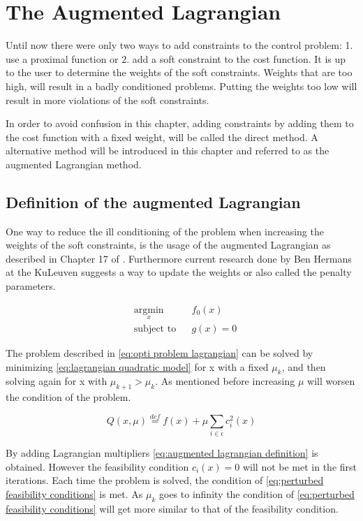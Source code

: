 \chapter{The Augmented Lagrangian}
Until now there were only two ways to add constraints to the control problem: 1. use a proximal function or 2. add a soft constraint to the cost function. It is up to the user to determine the weights of the soft constraints. Weights that are too high, will result in a badly conditioned problems. Putting the weights too low will result in more violations of the soft constraints.

In order to avoid confusion in this chapter, adding constraints by adding them to the cost function with a fixed weight, will be called the direct method. A alternative method will be introduced in this chapter and referred to as the augmented Lagrangian method.

\section{Definition of the augmented Lagrangian}
	One way to reduce the ill conditioning of the problem when increasing the weights of the soft constraints, is the usage of the augmented Lagrangian as described in Chapter 17 of \cite{Wright}. Furthermore current research done by Ben Hermans at the KuLeuven suggests a way to update the weights or also called the penalty parameters.
	
	\begin{equation}
		\begin{aligned}
			& \underset{x}{\text{argmin}}
			& & f_0(x) \\
			& \text{subject to}
			& & g(x)=0
		\end{aligned}
		\label{eq:opti problem lagrangian}
	\end{equation}
	
	The problem described in \eqref{eq:opti problem lagrangian} can be solved by minimizing \eqref{eq:lagrangian quadratic model}  for x with a fixed $\mu_k$, and then solving again for x with $\mu_{k+1}>\mu_k $. As mentioned before increasing $\mu$ will worsen the condition of the problem. 
	
	\begin{equation}
		Q(x,\mu) \overset{def}{=} f(x) + \mu \sum_{i \in \epsilon} c_i^2(x)
		\label{eq:lagrangian quadratic model}
	\end{equation}
	
	By adding Lagrangian multipliers \eqref{eq:augmented lagrangian definition} is obtained. However the feasibility condition $c_i(x)=0$ will not be met in the first iterations. Each time the problem is solved, the condition of \eqref{eq:perturbed feasibility conditions} is met. As $\mu_k$ goes to infinity the condition of \eqref{eq:perturbed feasibility conditions} will get more similar to that of the feasibility condition.
	
